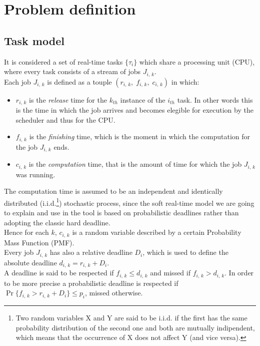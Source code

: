 \chapter{Problem definition}\label{chp:model}


\section{Task model}
It is considered a set of real-time tasks \( \{\tau_{i}\} \) which share a processing unit (CPU), where every task consists of a stream of jobs \( J_{i,\,k} \).\\
Each job \( J_{i,\,k} \) is defined as a touple \( \left(r_{i,\,k}, \;f_{i,\,k}, \;c_{i,\,k}\right) \) in which:
\begin{itemize}
  \item \( r_{i,\,k} \) is the \emph{release} time for the \( k_{th} \) instance of the \( i_{th} \) task. In other words this is the time in which the job arrives and becomes elegible for execution by the scheduler and thus for the CPU.
  \item \( f_{i,\,k} \) is the \emph{finishing} time, which is the moment in which the computation for the job \( J_{i,\,k} \) ends.
  \item \( c_{i,\,k} \) is the \emph{computation} time, that is the amount of time for which the job \( J_{i,\,k} \) was running.
\end{itemize} 

The computation time is assumed to be an independent and identically distributed (i.i.d.\footnote{Two random variables X and Y are said to be i.i.d. if the first has the same probability distribution of the second one and both are mutually indipendent, which means that the occurrence of X does not affect Y (and vice versa).}) stochastic process, since the soft real-time model we are going to explain and use in the tool is based on probabilistic deadlines rather than adopting the classic hard deadline.\\
Hence for each \( k \), \( c_{i,\,k} \) is a random variable described by a certain Probability Mass Function (PMF).\\
Every job \( J_{i,\,k} \) has also a relative deadline \( D_{i} \), which is used to define the absolute deadline \( d_{i,\,k} = r_{i,\,k} + D_{i} \). \\
A deadline is said to be respected if \( f_{i,\,k} \leq d_{i,\,k} \) and missed if \( f_{i,\,k} > d_{i,\,k} \). In order to be more precise a probabilistic deadline is respected if \( \Pr\{f_{i,\,k} > r_{i,\,k} + D_{i} \} \leq p_{i} \), missed otherwise.


